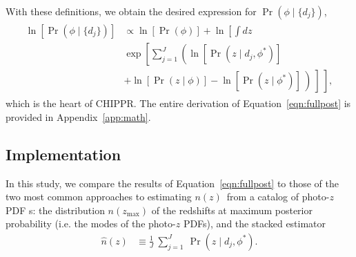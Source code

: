 \documentclass[iop]{emulateapj}
\newcommand{\chippr}{CHIPPR}
\newcommand{\nz}{$n(z)$}
\newcommand{\pzpdf}{photo-$z$ PDF}
\begin{document}
With these definitions, we obtain the desired expression for $\Pr(\phi \mid 
\{d_{j}\})$,
\begin{align}
\begin{split}
  \label{eqn:fullpost}
  \ln[\Pr(\phi \mid \{d_{j}\})] & \propto \ln[\Pr(\phi)] + \ln \left[\int dz 
\right.\\
  & \left. \exp \left[\sum_{j=1}^{J} \left(\ln[\Pr(z \mid d_{j}, \phi^{*})] 
\right. \right. \right.\\
  & \left. \left. \left. + \ln[\Pr(z \mid \phi)] - \ln[\Pr(z \mid \phi^{*})]\ 
\right)\ \right]\ \right] ,
\end{split}
\end{align}
which is the heart of \chippr.
The entire derivation of Equation~\ref{eqn:fullpost} is provided in 
Appendix~\ref{app:math}.

\subsection{Implementation}
\label{sec:implementation}

In this study, we compare the results of Equation~\ref{eqn:fullpost} to those 
of the two most common approaches to estimating \nz\ from a catalog of \pzpdf 
s: the distribution $n(z_{\mathrm{max}})$ of the redshifts at maximum posterior 
probability (i.e. the modes of the \pzpdf s), and the stacked estimator
\begin{align}
  \label{eqn:stacked}
  \hat{n}(z) &\equiv \frac{1}{J}\ \sum_{j=1}^{J}\ \Pr(z \mid d_{j}, \phi^{*}) .
\end{align}
\end{document}

